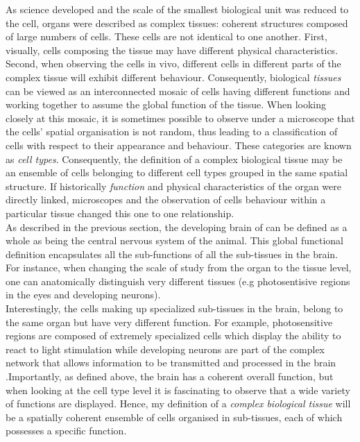     As science developed and the scale of the smallest biological unit was reduced to the cell, organs were described as complex tissues: coherent structures composed of large numbers of cells. These cells are not identical to one another. First, visually, cells composing the tissue may have different physical characteristics. Second, when observing the cells in vivo, different cells in different parts of the complex tissue will exhibit different behaviour. Consequently, biological \emph{tissues} can be viewed as an interconnected mosaic of cells having different functions and working together to assume the global function of the tissue. When looking closely at this mosaic, it is sometimes possible to observe under a microscope \citep{young13} that the cells' spatial organisation is not random, thus leading to a classification of cells with respect to their appearance and behaviour. These categories are known as \emph{cell types}. Consequently, the definition of a complex biological tissue may be an ensemble of cells belonging to different cell types grouped in the same spatial structure.  If historically \emph{function} and physical characteristics of the organ were directly linked, microscopes and the observation of cells behaviour within a particular tissue changed this one to one relationship.\\
    
    As described in the previous section, the developing brain of \platyfull{} can be defined as a whole as being the central nervous system of the animal. This global functional definition encapsulates all the sub-functions of all the sub-tissues in the brain. For instance, when changing the scale of study from the organ to the tissue level, one can anatomically distinguish very different tissues (e.g photosentisive regions in the eyes and developing neurons).\\
    
    Interestingly, the cells making up specialized sub-tissues in the brain, belong to the same organ but have very different function. For example, photosensitive regions are composed of extremely specialized cells which display the ability to react to light stimulation \cite{arendt02} while developing neurons are part of the complex network that allows information to be transmitted and processed in the brain \cite{Fischer10}.Importantly, as defined above, the brain has a coherent overall function, but when looking at the cell type level it is fascinating to observe that a wide variety of functions are displayed. Hence, my definition of a \emph{complex biological tissue} will be a spatially coherent ensemble of cells organised in sub-tissues, each of which possesses a specific function.\\
    
